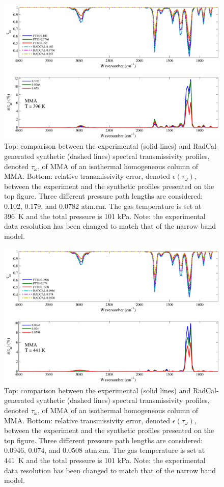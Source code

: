 \begin{figure}[p]
\includegraphics[width=\textwidth]{../Verification/Results_Test2/MMA_396.pdf}
\caption{Top: comparison between the experimental (solid lines) and RadCal-generated synthetic (dashed lines) spectral transmissivity profiles, denoted $\tau_{\omega}$, of MMA of an isothermal homogeneous column of MMA. Bottom: relative transmissivity error, denoted $\epsilon{(\tau_{\omega})}$, between the experiment and the synthetic profiles presented on the top figure. Three different pressure path lengths are considered: 0.102, 0.179, and 0.0782 atm.cm. The gas temperature is set at 396~K and the total pressure is 101 kPa. Note: the experimental data resolution has been changed to match that of the narrow band model. \label{fig:MMA_Verify_396K}}
\end{figure}

\begin{figure}[p]
\includegraphics[width=\textwidth]{../Verification/Results_Test2/MMA_441.pdf}
\caption{Top: comparison between the experimental (solid lines) and RadCal-generated synthetic (dashed lines) spectral transmissivity profiles, denoted $\tau_{\omega}$, of MMA of an isothermal homogeneous column of MMA. Bottom: relative transmissivity error, denoted $\epsilon{(\tau_{\omega})}$, between the experiment and the synthetic profiles presented on the top figure. Three different pressure path lengths are considered: 0.0946, 0.074, and 0.0508 atm.cm. The gas temperature is set at 441~K and the total pressure is 101 kPa. Note: the experimental data resolution has been changed to match that of the narrow band model. \label{fig:MMA_Verify_443K}}
\end{figure}

